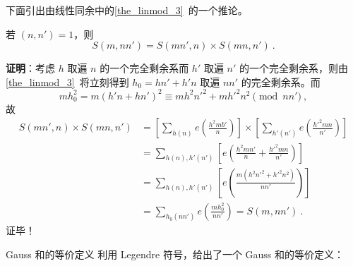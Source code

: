 下面引出由线性同余中的\autoref{the_linmod_3}~的一个推论。
\begin{corollary}{}
若 $(n, n') = 1$，则
\begin{equation}
S(m, nn') = S(mn', n) \times S(mn, n') ~.
\end{equation}

\end{corollary}
\textbf{证明}：考虑 $h$ 取遍 $n$ 的一个完全剩余系而 $h'$ 取遍 $n'$ 的一个完全剩余系，则由\autoref{the_linmod_3}~将立刻得到 $h_0 = hn' +h'n$ 取遍 $nn'$ 的完全剩余系。而
\begin{equation}
mh_0^2 = m(h'n + hn')^2 \equiv mh^2n'^2 + mh'^2n^2 \pmod{nn'} ~,
\end{equation}
故
\begin{equation}
\begin{aligned}
S(mn', n) \times S(mn, n') &= \left[ \sum_{h(n)} e\left(\frac{h^2mb'}{n}\right) \right] \times \left[\sum_{h'(n')} e\left(\frac{h'^2mn}{n'}\right)\right] \\
&= \sum_{h(n), h'(n')} \left[ e\left(\frac{h^2 mn'}{n} + \frac{h'^2 mn}{n'}\right)\right] \\
&= \sum_{h(n), h'(n')} \left[ e\left( \frac{m(h^2 n'^2 + h'^2 n^2)}{nn'} \right)\right]\\
&= \sum_{h_0(nn')} e\left( \frac{m h_0^2}{nn'} \right) = S(m, nn')~.
\end{aligned}
\end{equation}
证毕！

\begin{theorem}{Gauss 和的等价定义}
利用 Legendre 符号，给出了一个 Gauss 和的等价定义：
\equa
\end{theorem}